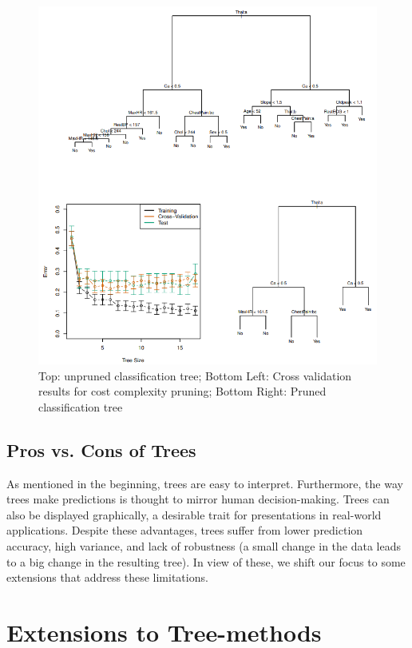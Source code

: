 \documentclass[10pt,a4paper]{article}
\begin{document}
\begin{figure}
\centering
\hspace{-1.4cm}
\includegraphics{pruning.png}
\caption{Top: unpruned classification tree; Bottom Left: Cross validation results for cost complexity pruning; Bottom Right: Pruned classification tree}
\label{pruning}
\end{figure}


\subsection{Pros vs. Cons of Trees}
As mentioned in the beginning, trees are easy to interpret. Furthermore, the way trees make predictions is thought to mirror human decision-making. Trees can also be displayed graphically, a desirable trait for presentations in real-world applications. Despite these advantages, trees suffer from lower prediction accuracy, high variance, and lack of robustness (a small change in the data leads to a big change in the resulting tree). In view of these, we shift our focus to some extensions that address these limitations.

\pagebreak

\section{Extensions to Tree-methods}
\end{document}
